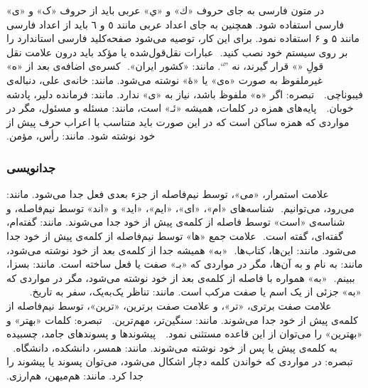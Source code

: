 ‫
‫
‫
‫
‫در متون فارسی به جای حروف «ك» و «ي» عربی باید از حروف «ک» و «ی» فارسی استفاده شود. همچنین به جای اعداد عربی مانند ٥ و ٦ باید از اعداد فارسی مانند ۵ و ۶ استفاده نمود.
‫برای این کار، توصیه می‌شود صفحه‌کلید‌ فارسی استاندارد را بر روی سیستم خود نصب کنید.
‫
‫عبارات نقل‌قول‌شده یا مؤکد باید درون علامت نقل قولِ «» قرار گیرند، نه ''``. مانند: «کشور ایران».
‫
‫کسره‌ی اضافه‌ی بعد از «ه» غیرملفوظ به صورت «ه‌ی» یا «هٔ» نوشته می‌شود. مانند: خانه‌ی علی، دنباله‌ی فیبوناچی.
‫
‫        تبصره‌: اگر «ه» ملفوظ باشد، نیاز به «‌ی» ندارد. مانند: فرمانده دلیر، پادشه خوبان.
‫
‫
‫پایه‌های همزه در کلمات، همیشه «ئـ» است، مانند: مسئله و مسئول، مگر در مواردی که همزه ساکن است که در این ‌صورت باید متناسب با اعراب حرف پیش از خود نوشته شود. مانند: رأس، مؤمن.
‫
‫
‫
‫
‫\subsubsection{جدانویسی}
‫
‫
‫
‫
‫
‫علامت استمرار، «می»، توسط نیم‌فاصله از جزء‌ بعدی فعل جدا می‌شود. مانند: می‌رود، می‌توانیم.
‫
‫شناسه‌های «ام»، «ای»، «ایم»، «اید» و «اند» توسط نیم‌فاصله، و شناسه‌ی «است» توسط فاصله از کلمه‌ی پیش از خود جدا می‌شوند. مانند: گفته‌ام، گفته‌ای، گفته است.
‫
‫علامت جمع «ها» توسط نیم‌فاصله از کلمه‌ی پیش از خود جدا می‌شود. مانند: این‌ها، کتاب‌ها.
‫
‫«به» همیشه جدا از کلمه‌ی بعد از خود نوشته می‌شود، مانند: به‌ نام و به آن‌ها، مگر در مواردی که «بـ» صفت یا فعل ساخته است. مانند: بسزا، ببینم.
‫
‫«به» همواره با فاصله از کلمه‌ی بعد از خود نوشته می‌شود، مگر در مواردی که «به» جزئی از یک اسم یا صفت مرکب است. مانند: تناظر یک‌به‌یک، سفر به تاریخ.
‫%
‫%
‫%
‫%
‫%
‫%
‫
‫%
‫%
‫%
‫%
‫
‫
‫علامت صفت برتری، «تر»، و علامت صفت برترین، «ترین»، توسط نیم‌فاصله از کلمه‌ی پیش از خود جدا می‌شوند.
‫مانند: سنگین‌تر، مهم‌ترین.
‫
‫        تبصره‌: کلمات «بهتر» و «بهترین» را می‌توان از این قاعده مستثنی نمود.
‫
‫
‫پیشوندها و پسوندهای جامد، چسبیده به کلمه‌ی پیش یا پس از خود نوشته می‌شوند. مانند: همسر، دانشکده، دانشگاه.
‫
‫        تبصره‌: در مواردی که خواندن کلمه دچار اشکال می‌شود، می‌توان پسوند یا پیشوند را جدا کرد. مانند: هم‌میهن، هم‌ارزی.

